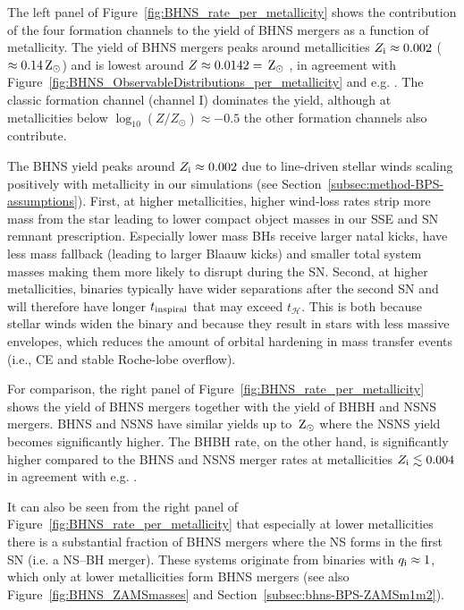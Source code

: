 \documentclass[twocolumn]{aastex63}
\newcommand\bhnsSingle{BHNS\xspace}
\newcommand{\qi}{\ensuremath{q_{\rm{i}}}\xspace}
\newcommand{\Zi}{\ensuremath{Z_{\rm{i}}}\xspace}
\newcommand{\Zsun}{\ensuremath{\,\rm{Z}_{\odot}}\xspace}
\newcommand{\tinspiral}{\ensuremath{{t}_{\rm{inspiral}}}\xspace}
\newcommand{\thubble}{\ensuremath{{t}_{\mathcal{H}}}\xspace}
\begin{document}
The left panel of Figure~\ref{fig:BHNS_rate_per_metallicity} shows the contribution of the four formation channels to the yield of \bhnsSingle  mergers as a function of metallicity.   The  yield of  \bhnsSingle mergers peaks around metallicities $\Zi\approx 0.002$  ($\approx 0.14 \Zsun$) and is lowest around $Z \approx 0.0142 = \Zsun$ , in agreement with Figure~\ref{fig:BHNS_ObservableDistributions_per_metallicity} and e.g.  \citet[][]{2018MNRAS.480.2011G, 2019MNRAS.487....2M, 2019MNRAS.490.3740N}.
The classic formation channel (channel I) dominates the yield, although at metallicities below $\log_{10}(Z/Z_{\odot}) \approx -0.5$ the other formation channels also contribute.   

The \bhnsSingle yield peaks around $\Zi\approx 0.002$ due to  line-driven stellar winds scaling positively with metallicity in our simulations (see Section~\ref{subsec:method-BPS-assumptions}).
%
First, at higher metallicities,  higher  wind-loss rates strip more mass from the star leading to lower compact object masses in our {SSE} and  \ac{SN} remnant prescription. Especially lower mass \acp{BH}  receive larger natal kicks, have less mass fallback (leading to larger Blaauw kicks) and  smaller total system masses making them more likely to disrupt during the \ac{SN}.
Second, at higher metallicities,  binaries typically have wider separations after the second SN and will therefore have longer \tinspiral that may exceed \thubble. This is both because stellar winds widen the binary and because they result in stars with less massive envelopes, which reduces the amount of orbital hardening in mass transfer events (i.e., \ac{CE} and stable Roche-lobe overflow).  

 
For comparison, the right panel of Figure~\ref{fig:BHNS_rate_per_metallicity} shows the yield of  \bhnsSingle mergers together with the yield of \ac{BHBH} and \ac{NSNS} mergers. 
BHNS and \ac{NSNS}  have  similar yields up to \Zsun  where the \ac{NSNS} yield becomes significantly higher. The \ac{BHBH} rate, on the other hand, is significantly higher compared to the \bhnsSingle and \ac{NSNS} merger rates at metallicities $\Zi \lesssim 0.004$ in agreement with e.g. \citet[][]{2016MNRAS.462.3302E,2018MNRAS.480.2011G,2018MNRAS.474.2959G,2019MNRAS.482.5012C, 2019MNRAS.490.3740N}. 


It can also be seen from the right panel of Figure~\ref{fig:BHNS_rate_per_metallicity} that especially at lower metallicities there is a substantial fraction of \bhnsSingle mergers where the \ac{NS} forms in the first \ac{SN} (i.e. a NS--BH merger). These systems originate from binaries with $\qi \approx 1$, which only at lower metallicities form \bhnsSingle mergers (see also Figure~\ref{fig:BHNS_ZAMSmasses} and Section~\ref{subsec:bhns-BPS-ZAMSm1m2}).
 
\end{document}
